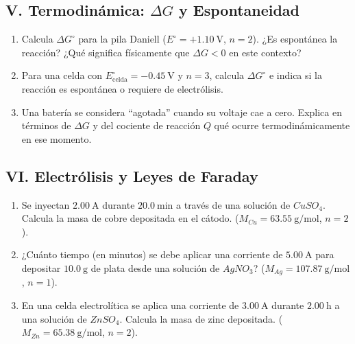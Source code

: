 \documentclass[letterpaper, 12pt, twoside]{article}
\begin{document}
\subsection*{V. Termodinámica: $\Delta G$ y Espontaneidad}

\begin{enumerate}[label=\textbf{\arabic*.}, start=18, itemsep=2.5em, leftmargin=*]

\item Calcula $\Delta G^\circ$ para la pila Daniell ($E^\circ = +1.10\ \text{V}$, $n = 2$). ¿Es espontánea la reacción? ¿Qué significa físicamente que $\Delta G < 0$ en este contexto?

\item Para una celda con $E^\circ_{\text{celda}} = -0.45\ \text{V}$ y $n = 3$, calcula $\Delta G^\circ$ e indica si la reacción es espontánea o requiere de electrólisis.

\item Una batería se considera ``agotada'' cuando su voltaje cae a cero. Explica en términos de $\Delta G$ y del cociente de reacción $Q$ qué ocurre termodinámicamente en ese momento.

\end{enumerate}
\newpage
\subsection*{VI. Electrólisis y Leyes de Faraday}

\begin{enumerate}[label=\textbf{\arabic*.}, start=21, itemsep=2.5em, leftmargin=*]

\item Se inyectan $2.00\ \text{A}$ durante $20.0\ \text{min}$ a través de una solución de $CuSO_4$. Calcula la masa de cobre depositada en el cátodo. ($M_{Cu} = 63.55\ \text{g/mol}$, $n = 2$).

\item ¿Cuánto tiempo (en minutos) se debe aplicar una corriente de $5.00\ \text{A}$ para depositar $10.0\ \text{g}$ de plata desde una solución de $AgNO_3$? ($M_{Ag} = 107.87\ \text{g/mol}$, $n = 1$).

\item En una celda electrolítica se aplica una corriente de $3.00\ \text{A}$ durante $2.00\ \text{h}$ a una solución de $ZnSO_4$. Calcula la masa de zinc depositada. ($M_{Zn} = 65.38\ \text{g/mol}$, $n = 2$).

\end{enumerate}
\end{document}
